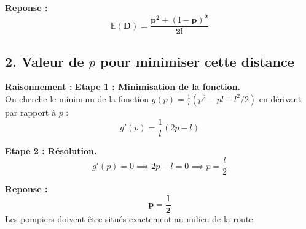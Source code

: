 \documentclass[11pt,a4paper]{article}
\begin{document}
\textbf{Reponse :}
$$ \mathbf{\mathbb{E}(D) = \frac{p^2 + (l-p)^2}{2l}} $$

\subsection*{2. Valeur de $p$ pour minimiser cette distance}

\textbf{Raisonnement :}
\textbf{Etape 1 : Minimisation de la fonction.}\\
On cherche le minimum de la fonction $g(p) = \frac{1}{l}(p^2 - pl + l^2/2)$ en dérivant par rapport à $p$ :
$$ g'(p) = \frac{1}{l} (2p - l) $$

\textbf{Etape 2 : Résolution.}\\
$$ g'(p) = 0 \implies 2p - l = 0 \implies p = \frac{l}{2} $$

\textbf{Reponse :}
$$ \mathbf{p = \frac{l}{2}} $$
Les pompiers doivent être situés exactement au milieu de la route.
\end{document}
